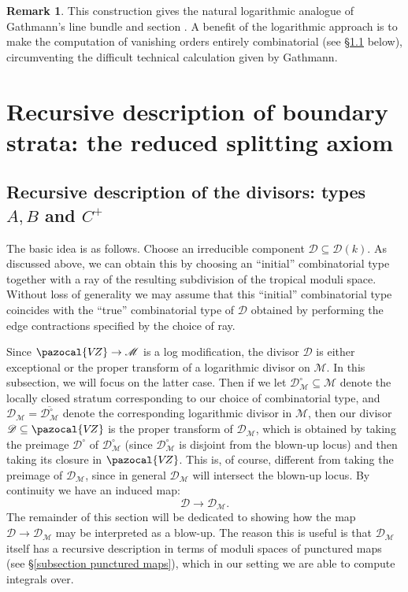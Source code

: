 \documentclass[11pt]{amsart}
\newcommand{\VZ}{\pazocal{V\!Z}}
\renewcommand{\to}{\rightarrow}
\newcommand{\Mcal}{\mathcal{M}}
\newcommand{\Dcal}{\mathcal{D}}
\theoremstyle{definition}
\theoremstyle{definition}
\newtheorem{remark}[thm]{Remark}
\begin{document}
\begin{remark} This construction gives the natural logarithmic analogue of Gathmann's line bundle and section \cite[Construction 2.1]{Ga}. A benefit of the logarithmic approach is to make the computation of vanishing orders entirely combinatorial (see \S \ref{} below), circumventing the difficult technical calculation given by Gathmann. \end{remark}


\section{Recursive description of boundary strata: the reduced splitting axiom}

\subsection{Recursive description of the divisors: types $A,B$ and $C^+$}

The basic idea is as follows. Choose an irreducible component $\Dcal \subseteq \Dcal(k)$. As discussed above, we can obtain this by choosing an ``initial'' combinatorial type together with a ray of the resulting subdivision of the tropical moduli space. Without loss of generality we may assume that this ``initial'' combinatorial type coincides with the ``true'' combinatorial type of $\Dcal$ obtained by performing the edge contractions specified by the choice of ray.

Since $\VZ \to \Mcal$ is a log modification, the divisor $\Dcal$ is either exceptional or the proper transform of a logarithmic divisor on $\Mcal$. In this subsection, we will focus on the latter case. Then if we let $\Dcal_{\Mcal}^\circ\subseteq \Mcal$ denote the locally closed stratum corresponding to our choice of combinatorial type, and $\Dcal_\Mcal = \overline{\Dcal^\circ_\Mcal}$ denote the corresponding logarithmic divisor in $\Mcal$, then our divisor $\Dcal\subseteq\VZ$ is the proper transform of $\Dcal_\Mcal$, which is obtained by taking the preimage $\Dcal^\circ$ of $\Dcal_\Mcal^\circ$ (since $\Dcal^\circ_\Mcal$ is disjoint from the blown-up locus) and then taking its closure in $\VZ$. This is, of course, different from taking the preimage of $\Dcal_\Mcal$, since in general $\Dcal_\Mcal$ will intersect the blown-up locus. By continuity we have an induced map:
\begin{equation*} \Dcal \to \Dcal_\Mcal. \end{equation*}
The remainder of this section will be dedicated to showing how the map $\Dcal \to \Dcal_\Mcal$ may be interpreted as a blow-up. The reason this is useful is that $\Dcal_\Mcal$ itself has a recursive description in terms of moduli spaces of punctured maps (see \S \ref{subsection punctured maps}), which in our setting we are able to compute integrals over.
\end{document}

